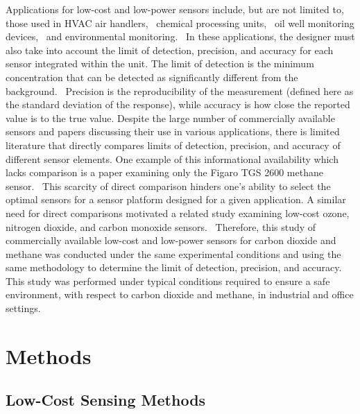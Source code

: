 \documentclass[times]{joehreview}
\begin{document}
	Applications for low-cost and low-power sensors include, but are not limited to, those used in HVAC air handlers,~\cite{yang_systematic_2014,chung_selective_2008} chemical processing units,~\cite{won_nonlinear_2012} oil well monitoring devices,~\cite{yi_remote_2010,somov_deployment_2013} and environmental monitoring.~\cite{pering_high_2014,black_formation_2012,guohua_study_2012,karunanithi_performance_2009,shendell_outdoor_2012}  	In these applications, the designer must also take into account the limit of detection, precision, and accuracy for each sensor integrated within the unit.  The limit of detection is the minimum concentration that can be detected as significantly different from the background.~\cite{long_limit_1983,currie_detection:_1997,mocak_j._statistical_2009}  Precision is the reproducibility of the measurement (defined here as the standard deviation of the response), while accuracy is how close the reported value is to the true value.  Despite the large number of commercially available sensors and papers discussing their use in various applications, there is limited literature that directly compares limits of detection, precision, and accuracy of different sensor elements.  One example of this informational availability which lacks comparison is a paper examining only the Figaro TGS 2600 methane sensor.~\cite{eugster_performance_2012}  This scarcity of direct comparison hinders one's ability to select the optimal sensors for a sensor platform designed for a given application.  A similar need for direct comparisons motivated a related study examining low-cost ozone, nitrogen dioxide, and carbon monoxide sensors.~\cite{low_cost}  Therefore, this study of commercially available low-cost and low-power sensors for carbon dioxide and methane was conducted under the same experimental conditions and using the same methodology to determine the limit of detection, precision, and accuracy.  This study was performed under typical conditions required to ensure a safe environment, with respect to carbon dioxide and methane, in industrial and office settings.
	
	\section*{Methods}
	\label{sec:methods}
	
	\subsection*{Low-Cost Sensing Methods }
	
\end{document}
